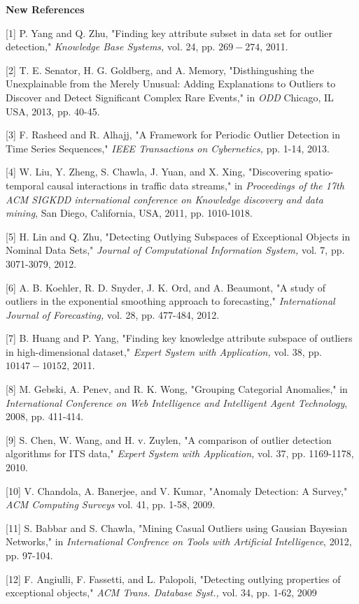 \documentclass{book}
\begin{document}
\textbf{New References }

[1]	P. Yang and Q. Zhu, "Finding key attribute subset in data set for outlier detection," \textit{Knowledge Base Systems, }vol. 24, pp. $269 - 274$, 2011.

[2]	T. E. Senator, H. G. Goldberg, and A. Memory, "Disthingushing the Unexplainable from the Merely Unusual: Adding Explanations to Outliers to Discover and Detect Significant Complex Rare Events," in \textit{ODD }Chicago, IL USA, 2013, pp. 40-45.

[3]	F. Rasheed and R. Alhajj, "A Framework for Periodic Outlier Detection in Time Series Sequences," \textit{IEEE Transactions on Cybernetics, }pp. 1-14, 2013.

[4]	W. Liu, Y. Zheng, S. Chawla, J. Yuan, and X. Xing, "Discovering spatio-temporal causal interactions in traffic data streams," in \textit{Proceedings of the 17th ACM SIGKDD international conference on Knowledge discovery and data mining}, San Diego, California, USA, 2011, pp. 1010-1018.

[5]	H. Lin and Q. Zhu, "Detecting Outlying Subspaces of Exceptional Objects in Nominal Data Sets," \textit{Journal of Computational Information System, }vol. 7, pp. 3071-3079, 2012.

[6]	A. B. Koehler, R. D. Snyder, J. K. Ord, and A. Beaumont, "A study of outliers in the exponential smoothing approach to forecasting," \textit{International Journal of Forecasting, }vol. 28, pp. 477-484, 2012.

[7]	B. Huang and P. Yang, "Finding key knowledge attribute subspace of outliers in high-dimensional dataset," \textit{Expert System with Application, }vol. 38, pp. $10147 - 10152$, 2011.

[8]	M. Gebski, A. Penev, and R. K. Wong, "Grouping Categorial Anomalies," in \textit{International Conference on Web Intelligence and Intelligent Agent Technology}, 2008, pp. 411-414.

[9]	S. Chen, W. Wang, and H. v. Zuylen, "A comparison of outlier detection algorithms for ITS data," \textit{Expert System with Application, }vol. 37, pp. 1169-1178, 2010.

[10]	V. Chandola, A. Banerjee, and V. Kumar, "Anomaly Detection: A Survey," \textit{ACM Computing Surveys }vol. 41, pp. 1-58, 2009.

[11]	S. Babbar and S. Chawla, "Mining Casual Outliers using Gausian Bayesian Networks," in \textit{International Confrence on Tools with Artificial Intelligence}, 2012, pp. 97-104.

[12]	F. Angiulli, F. Fassetti, and L. Palopoli, "Detecting outlying properties of exceptional objects," \textit{ACM Trans. Database Syst., }vol. 34, pp. 1-62, 2009
\end{document}
